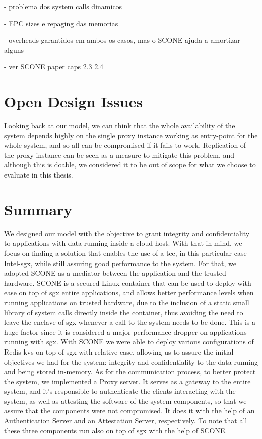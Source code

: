 - problema dos system calls dinamicos

- EPC sizes e repaging das memorias

- overheads garantidos em ambos os casos, mas o SCONE ajuda a amortizar alguns

- ver SCONE paper caps 2.3 2.4 

\section{Open Design Issues} %
\label{sec:design_openIssues}

Looking back at our model, we can think that the whole availability of the system depends highly on the single proxy instance working as entry-point for the whole system, and so all can be compromised if it fails to work. 
Replication of the proxy instance can be seen as a measure to mitigate this problem, and although this is doable, we considered it to be out of scope for what we choose to evaluate in this thesis. 



\section{Summary} %
\label{sec:sysModel_summary}

We designed our model with the objective to grant integrity and confidentiality to applications with data running inside a cloud host. With that in mind, we focus on finding a solution that enables the use of a \gls{tee}, in this particular case Intel-\gls{sgx}, while still assuring good performance to the system. 
For that, we adopted SCONE as a mediator between the application and the trusted hardware. SCONE is a secured Linux container that can be used to deploy with ease on top of \gls{sgx} entire applications, and allows better performance levels when running applications on trusted hardware, due to the inclusion of a static small library of system calls directly inside the container, thus avoiding the need to leave the enclave of \gls{sgx} whenever a call to the system needs to be done. This is a huge factor since it is considered a major performance dropper on applications running with \gls{sgx}. 
With SCONE we were able to deploy various configurations of Redis \gls{kvs} on top of \gls{sgx} with relative ease, allowing us to assure the initial objectives we had for the system: integrity and confidentiality to the data running and being stored in-memory. 
As for the communication process, to better protect the system, we implemented a Proxy server. It serves as a gateway to the entire system, and it's responsible to authenticate the clients interacting with the system, as well as attesting the software of the system components, so that we assure that the components were not compromised. It does it with the help of an Authentication Server and an Attestation Server, respectively. To note that all these three components run also on top of \gls{sgx} with the help of SCONE. 

